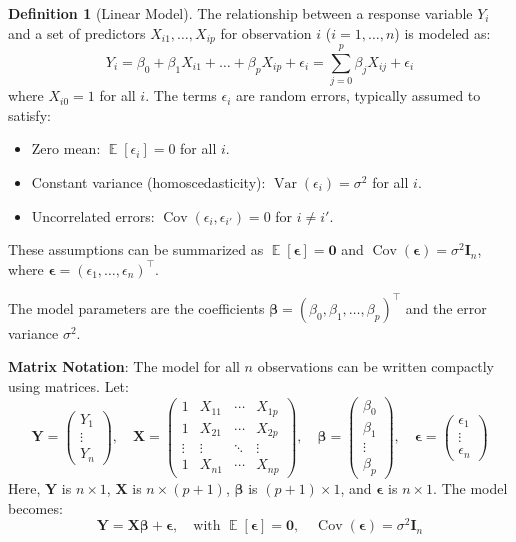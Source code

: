 \documentclass[11pt, a4paper]{article}
\DeclareMathOperator{\E}{\mathbb{E}}             %
\DeclareMathOperator{\Var}{\mathrm{Var}}         %
\DeclareMathOperator{\Cov}{\mathrm{Cov}}         %
\theoremstyle{definition}
\newtheorem{definition}[theorem]{Definition}
\theoremstyle{remark}
\newcommand{\mat}[1]{\mathbf{#1}}       %
\newcommand{\vect}[1]{\bm{#1}}          %
\newcommand{\transpose}{^{\top}}        %
\begin{document}
\begin{definition}[Linear Model]
The relationship between a response variable $Y_i$ and a set of predictors $X_{i1}, \dots, X_{ip}$ for observation $i$ ($i=1, \dots, n$) is modeled as:
\[ Y_i = \beta_0 + \beta_1 X_{i1} + \dots + \beta_p X_{ip} + \epsilon_i = \sum_{j=0}^{p} \beta_j X_{ij} + \epsilon_i \]
where $X_{i0} = 1$ for all $i$. The terms $\epsilon_i$ are random errors, typically assumed to satisfy:
\begin{itemize}
    \item Zero mean: $\E[\epsilon_i] = 0$ for all $i$.
    \item Constant variance (homoscedasticity): $\Var(\epsilon_i) = \sigma^2$ for all $i$.
    \item Uncorrelated errors: $\Cov(\epsilon_i, \epsilon_{i'}) = 0$ for $i \neq i'$.
\end{itemize}
These assumptions can be summarized as $\E[\vect{\epsilon}] = \vect{0}$ and $\Cov(\vect{\epsilon}) = \sigma^2 \mat{I}_n$, where $\vect{\epsilon} = (\epsilon_1, \dots, \epsilon_n)\transpose$.

The model parameters are the coefficients $\vect{\beta} = (\beta_0, \beta_1, \dots, \beta_p)\transpose$ and the error variance $\sigma^2$.
\end{definition}

\textbf{Matrix Notation}:
The model for all $n$ observations can be written compactly using matrices. Let:
\[ \vect{Y} = \begin{pmatrix} Y_1 \\ \vdots \\ Y_n \end{pmatrix}, \quad \mat{X} = \begin{pmatrix} 1 & X_{11} & \cdots & X_{1p} \\ 1 & X_{21} & \cdots & X_{2p} \\ \vdots & \vdots & \ddots & \vdots \\ 1 & X_{n1} & \cdots & X_{np} \end{pmatrix}, \quad \vect{\beta} = \begin{pmatrix} \beta_0 \\ \beta_1 \\ \vdots \\ \beta_p \end{pmatrix}, \quad \vect{\epsilon} = \begin{pmatrix} \epsilon_1 \\ \vdots \\ \epsilon_n \end{pmatrix} \]
Here, $\vect{Y}$ is $n \times 1$, $\mat{X}$ is $n \times (p+1)$, $\vect{\beta}$ is $(p+1) \times 1$, and $\vect{\epsilon}$ is $n \times 1$.
The model becomes:
\[ \vect{Y} = \mat{X} \vect{\beta} + \vect{\epsilon}, \quad \text{with } \E[\vect{\epsilon}] = \vect{0}, \quad \Cov(\vect{\epsilon}) = \sigma^2 \mat{I}_n \]
\end{document}
